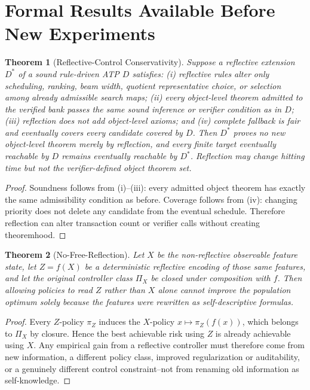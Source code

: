 \documentclass[11pt]{article}
\newtheorem{theorem}{Theorem}[section]
\begin{document}
\section{Formal Results Available Before New Experiments}
\begin{theorem}[Reflective-Control Conservativity]
Suppose a reflective extension $D^*$ of a sound rule-driven ATP $D$ satisfies: (i) reflective rules alter only scheduling, ranking, beam width, quotient representative choice, or selection among already admissible search maps; (ii) every object-level theorem admitted to the verified bank passes the same sound inference or verifier condition as in $D$; (iii) reflection does not add object-level axioms; and (iv) complete fallback is fair and eventually covers every candidate covered by $D$. Then $D^*$ proves no new object-level theorem merely by reflection, and every finite target eventually reachable by $D$ remains eventually reachable by $D^*$. Reflection may change hitting time but not the verifier-defined object theorem set.
\end{theorem}
\begin{proof}
Soundness follows from (i)--(iii): every admitted object theorem has exactly the same admissibility condition as before. Coverage follows from (iv): changing priority does not delete any candidate from the eventual schedule. Therefore reflection can alter transaction count or verifier calls without creating theoremhood.
\end{proof}

\begin{theorem}[No-Free-Reflection]
Let $X$ be the non-reflective observable feature state, let $Z=f(X)$ be a deterministic reflective encoding of those same features, and let the original controller class $\Pi_X$ be closed under composition with $f$. Then allowing policies to read $Z$ rather than $X$ alone cannot improve the population optimum solely because the features were rewritten as self-descriptive formulas.
\end{theorem}
\begin{proof}
Every $Z$-policy $\pi_Z$ induces the $X$-policy $x\mapsto\pi_Z(f(x))$, which belongs to $\Pi_X$ by closure. Hence the best achievable risk using $Z$ is already achievable using $X$. Any empirical gain from a reflective controller must therefore come from new information, a different policy class, improved regularization or auditability, or a genuinely different control constraint--not from renaming old information as self-knowledge.
\end{proof}
\end{document}

